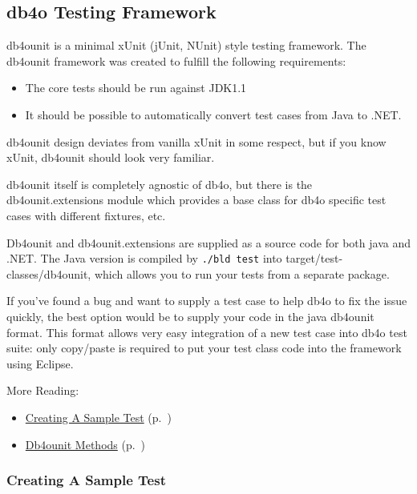 \subsection{db4o Testing Framework}
\label{ref:community-working-with-source-db4o-testing-framework}

db4ounit is a minimal xUnit (jUnit, NUnit) style testing framework. The db4ounit framework was created to fulfill the following requirements:

\begin{itemize}
\item The core tests should be run against JDK1.1
\item It should be possible to automatically convert test cases from Java to .NET.
\end{itemize}

db4ounit design deviates from vanilla xUnit in some respect, but if you know xUnit, db4ounit should look very familiar.

db4ounit itself is completely agnostic of db4o, but there is the db4ounit.extensions module which provides a base class for db4o specific test cases with different fixtures, etc.

Db4ounit and db4ounit.extensions are supplied as a source code for both java and .NET. The Java version is compiled by \texttt{./bld test} into target/test-classes/db4ounit, which allows you to run your tests from a separate package.

If you've found a bug and want to supply a test case to help db4o to fix the issue quickly, the best option would be to supply your code in the java db4ounit format. This format allows very easy integration of a new test case into db4o test suite: only copy/paste is required to put your test class code into the framework using Eclipse.

More Reading:

\begin{itemize}
\item \hyperref[ref:community-working-with-source-db4o-testing-framework-creating-a-sample-test]{Creating A Sample Test} (p.~\pageref{ref:community-working-with-source-db4o-testing-framework-creating-a-sample-test})
\item \hyperref[ref:community-working-with-source-db4o-testing-framework-db4ounit-methods]{Db4ounit Methods} (p.~\pageref{ref:community-working-with-source-db4o-testing-framework-db4ounit-methods})
\end{itemize}

\subsubsection{Creating A Sample Test}
\label{ref:community-working-with-source-db4o-testing-framework-creating-a-sample-test}

